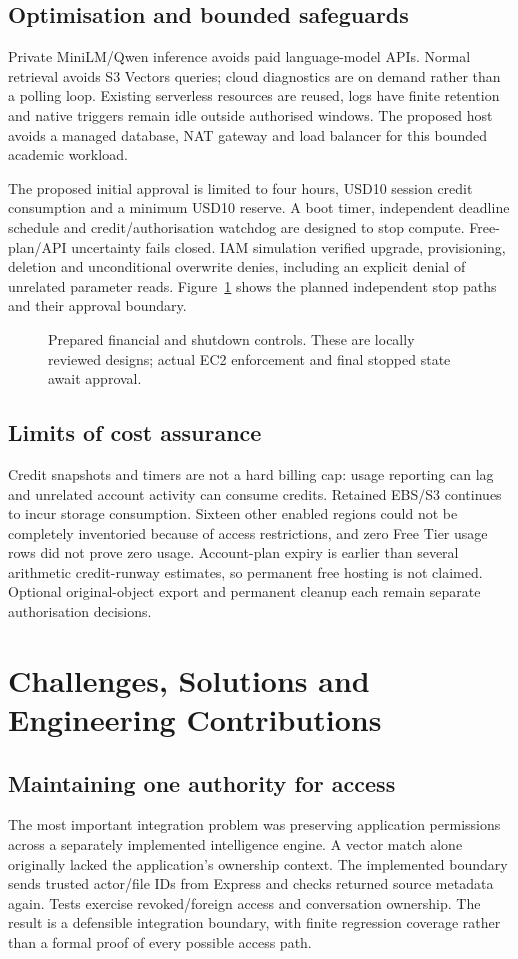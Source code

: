 \documentclass[11pt,a4paper,oneside]{report}
\newcommand{\ShortCaption}[1]{\csname ShortCaption#1\endcsname}
\newcommand{\diagram}[3]{\par\begin{figure}[htbp]\centering\sbox{\DiagramBox}{}\ifdim\wd\DiagramBox>\linewidth\resizebox{\linewidth}{!}{\usebox{\DiagramBox}}\else\usebox{\DiagramBox}\fi\caption[\ShortCaption{#1}]{#2}\label{fig:#3}\end{figure}\par}
\begin{document}
\section{Optimisation and bounded safeguards}
Private MiniLM/Qwen inference avoids paid language-model APIs. Normal retrieval avoids S3 Vectors queries; cloud diagnostics are on demand rather than a polling loop. Existing serverless resources are reused, logs have finite retention and native triggers remain idle outside authorised windows. The proposed host avoids a managed database, NAT gateway and load balancer for this bounded academic workload.

The proposed initial approval is limited to four hours, USD10 session credit consumption and a minimum USD10 reserve. A boot timer, independent deadline schedule and credit/authorisation watchdog are designed to stop compute. Free-plan/API uncertainty fails closed. IAM simulation verified upgrade, provisioning, deletion and unconditional overwrite denies, including an explicit denial of unrelated parameter reads.
Figure~\ref{fig:shutdown} shows the planned independent stop paths and their approval boundary.
{\setlength{\intextsep}{5pt}\setlength{\textfloatsep}{6pt}
\diagram{shutdown}{Prepared financial and shutdown controls. These are locally reviewed designs; actual EC2 enforcement and final stopped state await approval.}{shutdown}
}
\section{Limits of cost assurance}
Credit snapshots and timers are not a hard billing cap: usage reporting can lag and unrelated account activity can consume credits. Retained EBS/S3 continues to incur storage consumption. Sixteen other enabled regions could not be completely inventoried because of access restrictions, and zero Free Tier usage rows did not prove zero usage. Account-plan expiry is earlier than several arithmetic credit-runway estimates, so permanent free hosting is not claimed. Optional original-object export and permanent cleanup each remain separate authorisation decisions.
\FloatBarrier

\chapter{Challenges, Solutions and Engineering Contributions}
\section{Maintaining one authority for access}
The most important integration problem was preserving application permissions across a separately implemented intelligence engine. A vector match alone originally lacked the application's ownership context. The implemented boundary sends trusted actor/file IDs from Express and checks returned source metadata again. Tests exercise revoked/foreign access and conversation ownership. The result is a defensible integration boundary, with finite regression coverage rather than a formal proof of every possible access path.
\end{document}
